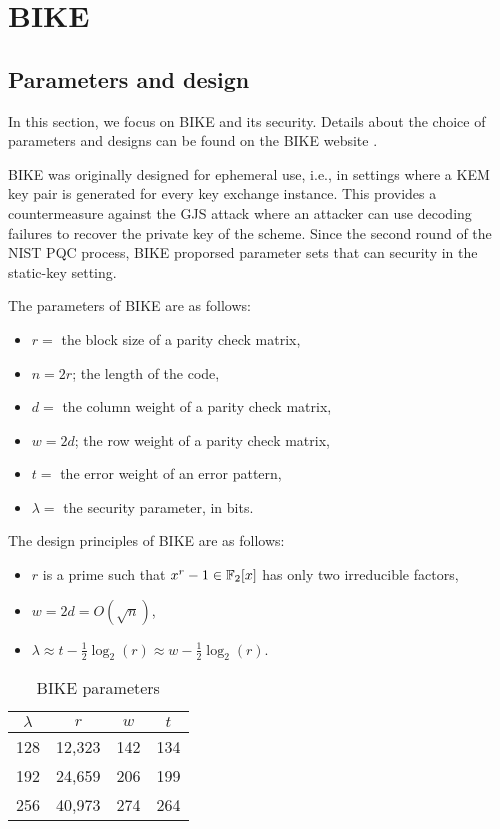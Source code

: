 \chapter{BIKE}

\section{Parameters and design}

In this section, we focus on BIKE and its security. Details about the choice of parameters and designs can be found on the BIKE website \cite{BIKE}.

BIKE was originally designed for ephemeral use, i.e., in settings where a KEM key pair is generated for every key exchange instance. This provides a countermeasure against the GJS attack \cite{gjs} where an attacker can use decoding failures to recover the private key of the scheme. Since the second round of the NIST PQC process, BIKE proporsed parameter sets that can security in the static-key setting.

The parameters of BIKE are as follows:

\begin{itemize}
\item $r = $ the block size of a parity check matrix,
\item $n = 2r$; the length of the code,
\item $d = $ the column weight of a parity check matrix,
\item $w = 2d$; the row weight of a parity check matrix,
\item $t = $ the error weight of an error pattern,
\item $\lambda = $ the security parameter, in bits.
\end{itemize}

The design principles of BIKE are as follows:

\begin{itemize}
\item $r$ is a prime such that $x^r -1 \in \mathbb{F}_2[x]$ has only two irreducible factors,
\item $w = 2d = O(\sqrt{n})$,
\item $\lambda \approx t - \frac{1}{2}\log_2(r) \approx w - \frac{1}{2}\log_2(r)$.
\end{itemize}

\begin{table}[h]
\centering
\begin{tabular}{cccc}
\hline
$\lambda$ & $r$ & $w$ & $t$ \\ \hline
128 & 12,323 & 142 & 134 \\
192 & 24,659 & 206 & 199 \\
256 & 40,973 & 274 & 264 \\ \hline
\end{tabular}
\caption{BIKE parameters}
\end{table}

